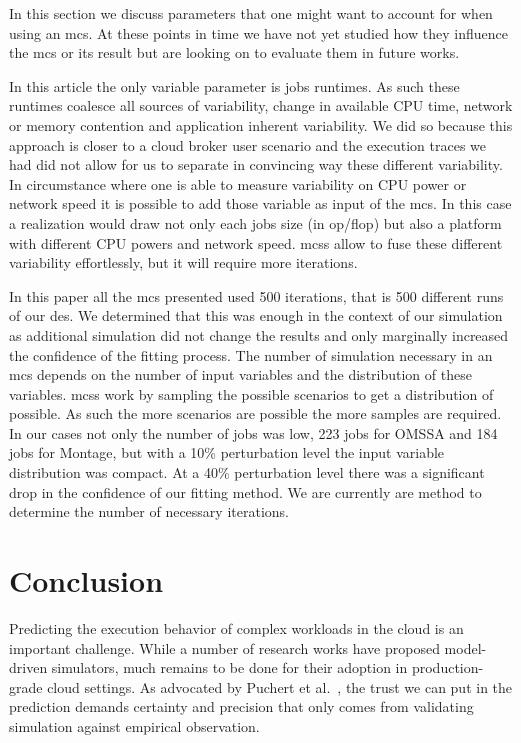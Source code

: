 \documentclass[10pt,conference,compsocconf]{IEEEtran}
\begin{document}
In this section we discuss parameters that one might want to account for when
using an \ac{mcs}. At these points in time we have not yet studied how they
influence the \ac{mcs} or its result but are looking on to evaluate them in
future works.

In this article the only variable parameter is jobs runtimes. As such these
runtimes coalesce all sources of variability, change in available CPU time,
network or memory contention and application inherent variability. We did so
because this approach is closer to a cloud broker user scenario and  the
execution traces we had did not allow for us to separate in convincing way these
different variability. In circumstance where one is able to measure variability
on CPU power or network speed it is possible to add those variable as input of
the \ac{mcs}. In this case a realization would draw not only each jobs size (in
op/flop) but also a platform with different CPU powers and network speed.
\acp{mcs} allow to fuse these different variability effortlessly, but it will
require more iterations. 

In this paper all the \ac{mcs} presented used 500 iterations, that is 500
different runs of our \ac{des}. We determined that this was enough in the
context of our simulation as additional simulation did not change the results
and only marginally increased the confidence of the fitting process. The number
of simulation necessary in an \ac{mcs} depends on the number of input variables
and the distribution of these variables. \aclp{mcs} work by sampling the possible
scenarios to get a distribution of possible. As such the more scenarios are
possible the more samples are required. In our cases not only the number of jobs
was low, 223 jobs for OMSSA and 184 jobs for Montage, but with a 10\%
perturbation level the input variable distribution was compact. At a 40\%
perturbation level there was a significant drop in the confidence of our fitting
method. We are currently are method to determine the number of necessary
iterations.

\section{Conclusion}
Predicting  the execution  behavior  of complex  workloads in  the  cloud is  an
important challenge. While a number of research works have proposed model-driven
simulators, much remains to be done for their adoption in production-grade cloud
settings. As  advocated by Puchert  et al.~\cite{PucherGWK15}, the trust  we can
put in  the prediction  demands certainty  and precision  that only  comes from
validating simulation against empirical observation.
\end{document}
